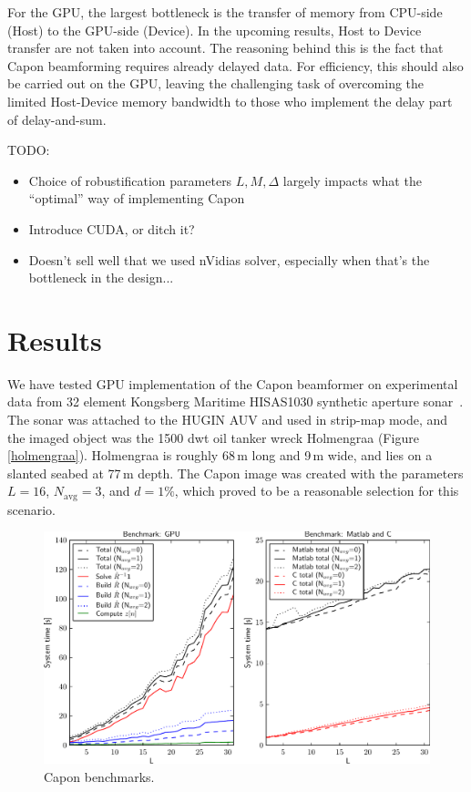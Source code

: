 \documentclass[10pt,a4paper]{article}
\newcommand\1{\vec 1}
\renewcommand\gls[1]{#1}
\begin{document}
For the GPU, the largest bottleneck is the transfer of memory from CPU-side (Host) to the GPU-side (Device). In the upcoming results, Host to Device transfer are not taken into account. The reasoning behind this is the fact that Capon beamforming requires already delayed data. For efficiency, this should also be carried out on the GPU, leaving the challenging task of overcoming the limited Host-Device memory bandwidth to those who implement the delay part of delay-and-sum. 


TODO:
\begin{itemize}
\item Choice of robustification parameters $L,M,\Delta$ largely impacts what the ``optimal'' way of implementing Capon 
\item Introduce CUDA, or ditch it?
\item Doesn't sell well that we used nVidias solver, especially when that's the bottleneck in the design...
\end{itemize}

\newpage

\section{Results}

We have tested \gls{GPU} implementation of the Capon beamformer on experimental data from 32 element Kongsberg Maritime HISAS1030 synthetic aperture sonar~\cite{Hansen2009}. The sonar was attached to the HUGIN \gls{AUV} and used in strip-map mode, and the imaged object was the 1500 dwt oil tanker wreck Holmengraa (Figure \ref{holmengraa}). Holmengraa is roughly 68\,m long and 9\,m wide, and lies on a slanted seabed at 77\,m depth. The Capon image was created with the parameters $L=16$, $N_\text{avg}=3$, and $d=1\%$, which proved to be a reasonable selection for this scenario.

\begin{figure}[!t]
\centering
\includegraphics[width=\linewidth]{gfx/benchmark.pdf}
\caption{Capon benchmarks.}\label{benchmarks}
\end{figure}
\end{document}
